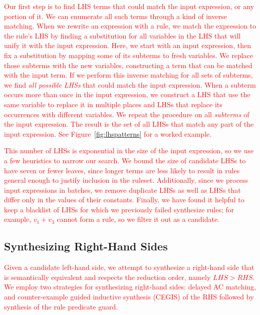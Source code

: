 \documentclass[acmsmall,review]{acmart}\settopmatter{printfolios=true,printccs=false,printacmref=false}
\newcommand{\modified}[1]{\textcolor{red}{{#1}}}
\begin{document}
\modified{
  Our first step is to find LHS terms that could match the input expression, or any portion of it. 
We can enumerate all such terms through a kind of inverse matching.
When we rewrite an expression with a rule, 
we match the expression to the rule's LHS by finding a substitution for all variables in
the LHS that will unify it with the input expression. Here, we start with an input expression,
then fix a substitution by mapping some of its subterms to fresh variables. We 
replace those subterms with the new variables, constructing a term that can 
be matched with the input term.
If we perform this inverse matching for all sets of subterms, we find \emph{all possible LHSs} that could match the
input expression. 
When a subterm occurs more than once in the input expression, we construct a LHS that 
use the same variable to replace it in multiple places and LHSs that replace its
occurrences with different variables.
We repeat the procedure on all \emph{subterms} of the input expression.  The result is the set of all 
LHSs that match any part of the input expression. See Figure~\ref{fig:lhspatterns} for a worked example. }

\modified{This number of LHSs is exponential in the size of the input expression, so we use a few heuristics to narrow 
our search. We bound the size of candidate LHSs to have seven or fewer leaves, since longer terms are less likely to 
result in rules general enough to justify inclusion in the ruleset. 
Additionally, since we process input expressions in batches, we remove 
duplicate LHSs as well as LHSs that differ only in the values of their constants. 
Finally, we have found it helpful to keep a blacklist of LHSs for which we previously
failed synthesize rules; for example, $v_1 + v_3$ 
cannot form a rule, so we filter it out as a candidate.}

\subsection{Synthesizing Right-Hand Sides} 
\label{sec:synthesizing-candidate-rules}
\modified{%
Given a candidate left-hand side, we attempt to 
synthesize a right-hand side that is semantically equivalent and
respects the reduction order, namely $\mathit{LHS} > \mathit{RHS}$.
We employ two strategies for synthesizing right-hand sides:
delayed AC matching, and counter-example guided inductive synthesis (CEGIS) of 
the RHS followed by synthesis of the rule predicate guard.} 
\end{document}
